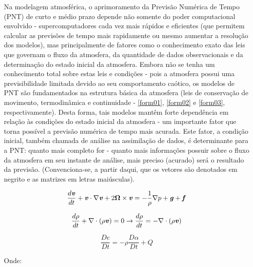 Na modelagem atmosférica, o aprimoramento da Previsão Numérica de Tempo (PNT) de curto e médio prazo depende não somente do poder computacional envolvido - supercomputadores cada vez mais rápidos e eficientes (que permitem calcular as previsões de tempo mais rapidamente ou mesmo aumentar a resolução dos modelos), mas principalmente de fatores como o conhecimento exato das leis que governam o fluxo da atmosfera, da quantidade de dados observacionais e da determinação do estado inicial da atmosfera.  Embora não se tenha um conhecimento total sobre estas leis e condições - pois a atmosfera possui uma previsibilidade limitada devido ao seu comportamento caótico, os modelos de PNT são fundamentados na estrutura básica da atmosfera (leis de conservação de movimento, termodinâmica e continuidade - \autoref{form01}, \autoref{form02} e \autoref{form03}, respectivamente). Desta forma, tais modelos mantêm forte dependência em relação às condições do estado inicial da atmosfera - um importante fator que torna possível a previsão numérica de tempo mais acurada. Este fator, a condição inicial, também chamada de análise na assimilação de dados, é determinante para a PNT: quanto mais completo for - quanto mais informações possuir sobre o fluxo da atmosfera em seu instante de análise, mais preciso (acurado) será o resultado da previsão. (Convenciona-se, a partir daqui, que os vetores são denotados em negrito e as matrizes em letras maiúsculas).

\begin{equation}
\frac{d\textbf{\textit{v}}}{dt}+\textbf{\textit{v}}\cdot\nabla\textbf{\textit{v}}+2\mathbf{\Omega}\times\textbf{\textit{v}}=-\frac{1}{\rho}\nabla{p}+\textbf{\textit{g}}+\textbf{\textit{f}}
\label{form01}
\end{equation}

\begin{equation}
\frac{d\rho}{dt}+\nabla\cdot(\rho\textbf{\textit{v}})=0\rightarrow\frac{d\rho}{dt}=-\nabla\cdot(\rho\textbf{\textit{v}})
\label{form02}
\end{equation}

\begin{equation}
\frac{D\textit{e}}{D\textit{t}}=-\rho\frac{D\alpha}{D\textit{t}}+\textit{Q}
\label{form03}
\end{equation}

Onde:

